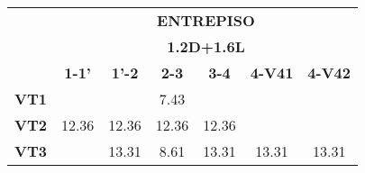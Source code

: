 \begin{table}[H]
  \centering
 
\begin{tabular}{|c|c|c|c|c|c|c|} 
\hhline{~------|}
\multicolumn{1}{c|}{}                           & \multicolumn{6}{c|}{{\cellcolor[rgb]{0.741,0.89,0.741}}\textbf{ENTREPISO}}                                                                                                                                                                                                                                       \\ 
\hhline{~------|}
\multicolumn{1}{c|}{}                           & \multicolumn{6}{c|}{{\cellcolor[rgb]{0.741,0.89,0.741}}\textbf{1.2D+1.6L}}                                                                                                                                                                                                                                       \\ 
\hhline{~------|}
\multicolumn{1}{c|}{}                           & {\cellcolor[rgb]{0.741,0.89,0.741}}\textbf{1-1'} & {\cellcolor[rgb]{0.741,0.89,0.741}}\textbf{1'-2} & {\cellcolor[rgb]{0.741,0.89,0.741}}\textbf{2-3} & {\cellcolor[rgb]{0.741,0.89,0.741}}\textbf{3-4} & {\cellcolor[rgb]{0.741,0.89,0.741}}\textbf{4-V41} & {\cellcolor[rgb]{0.741,0.89,0.741}}\textbf{4-V42}  \\ 
\hline
{\cellcolor[rgb]{0.741,0.89,0.741}}\textbf{VT1} & ~                                                & ~                                                & 7.43                                            & ~                                               & ~                                                 & ~                                                  \\ 
\hline
{\cellcolor[rgb]{0.741,0.89,0.741}}\textbf{VT2} & 12.36                                            & 12.36                                            & 12.36                                           & 12.36                                           & ~                                                 & ~                                                  \\ 
\hline
{\cellcolor[rgb]{0.741,0.89,0.741}}\textbf{VT3} & ~                                                & 13.31                                            & 8.61                                            & 13.31                                           & 13.31                                             & 13.31                                              \\ 

\end{tabular}
\end{table}
